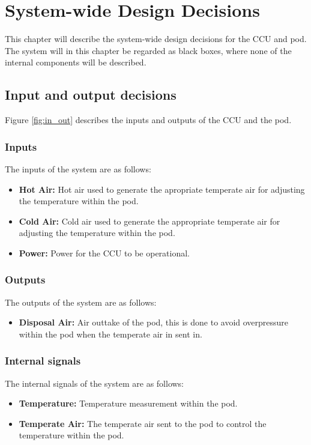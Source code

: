 \chapter{System-wide Design Decisions}
\label{chp:system-wide}
This chapter will describe the system-wide design decisions for the CCU and pod.
The system will in this chapter be regarded as black boxes, where none of the internal components will be described.

\section{Input and output decisions}
Figure \ref{fig:in_out} describes the inputs and outputs of the CCU and the pod.


\subsection{Inputs}
The inputs of the system are as follows:
\begin{itemize}
    \item \textbf{Hot Air:} Hot air used to generate the apropriate temperate air for adjusting the temperature within the pod.
    \item \textbf{Cold Air:} Cold air used to generate the appropriate temperate air for adjusting the temperature within the pod.
    \item \textbf{Power:} Power for the CCU to be operational.
\end{itemize}

\subsection{Outputs}
The outputs of the system are as follows:
\begin{itemize}
    \item \textbf{Disposal Air:} Air outtake of the pod, this is done to avoid overpressure within the pod when the temperate air in sent in.
\end{itemize}

\newpage
\subsection{Internal signals}
The internal signals of the system are as follows:
\begin{itemize}
    \item \textbf{Temperature:} Temperature measurement within the pod.
    \item \textbf{Temperate Air:} The temperate air sent to the pod to control the temperature within the pod.
\end{itemize}


